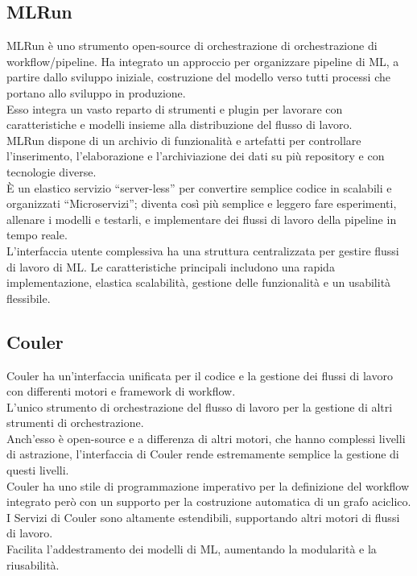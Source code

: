 \documentclass[../tesi.tex]{subfiles}
\begin{document}
  \subsection{MLRun}
MLRun è uno strumento open-source di orchestrazione di orchestrazione di workflow/pipeline. Ha integrato un approccio per organizzare pipeline di ML, a partire dallo sviluppo iniziale, costruzione del modello verso tutti processi che portano allo sviluppo in produzione.\\
Esso integra un vasto reparto di strumenti e plugin per lavorare con caratteristiche e modelli insieme alla distribuzione del flusso di lavoro.\\
MLRun dispone di un archivio di funzionalità e artefatti per controllare l’inserimento, l’elaborazione e l’archiviazione dei dati su più repository e con tecnologie diverse.\\
È un elastico servizio ``\Gls{server-less}'' per convertire semplice codice in scalabili e organizzati ``\Gls{Microservizi}''; diventa così più semplice e leggero fare esperimenti, allenare i modelli e testarli, e implementare dei flussi di lavoro della pipeline in tempo reale.\\
L’interfaccia utente complessiva ha una struttura centralizzata per gestire flussi di lavoro di ML. Le caratteristiche principali includono una rapida implementazione, elastica scalabilità, gestione delle funzionalità e un usabilità flessibile.\\


\subsection{Couler}
Couler ha un’interfaccia unificata per il codice e la gestione dei flussi di lavoro con differenti motori e framework di workflow.\\
L'unico strumento di orchestrazione del flusso di lavoro per la gestione di altri strumenti di orchestrazione.\\
Anch’esso è open-source e a differenza di altri motori, che hanno complessi livelli di astrazione, l’interfaccia di Couler rende estremamente semplice la gestione di questi livelli.\\
Couler ha uno stile di programmazione imperativo per la definizione del workflow integrato però con un supporto per la costruzione automatica di un \Gls{grafo aciclico}.\\
I Servizi di Couler sono altamente estendibili, supportando altri motori di flussi di lavoro.\\
Facilita l’addestramento dei modelli di ML, aumentando la modularità e la riusabilità.
\end{document}
